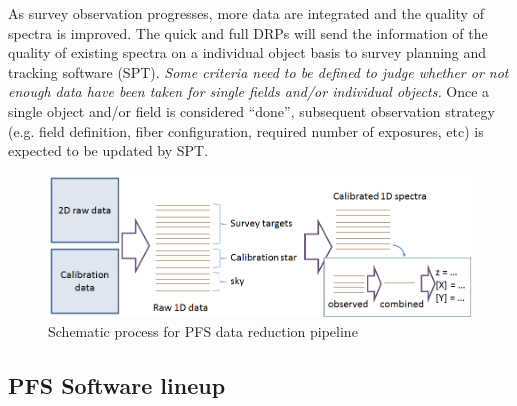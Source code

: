 \documentclass[a4paper,notitlepage]{article}
\begin{document}
As survey observation progresses, more data are integrated and the
quality of spectra is improved. The quick and full DRPs will send the
information of the quality of existing spectra on a individual object
basis to survey planning and tracking software (SPT). {\it Some criteria
need to be defined to judge whether or not enough data have been taken for
single fields and/or individual objects.} Once a single object and/or
field is considered ``done'', subsequent observation strategy
(e.g. field definition, fiber configuration, required number of
exposures, etc) is expected to be updated by SPT.

\begin{figure}[htb]
  \begin{center}
    \includegraphics[width=.75\linewidth]{sciops-scireq-drp-slide.png}
  \end{center}
  \caption{Schematic process for PFS data reduction pipeline}
  \label{fig:sciops-scireq-drp-slide}
\end{figure}

\subsection{PFS Software lineup}
\end{document}
